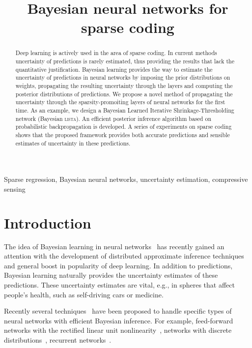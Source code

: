 \documentclass{article}
\title{Bayesian neural networks for sparse coding}
\begin{document}
\maketitle

\begin{abstract}
  Deep learning is actively used in the area of sparse coding. In current methods uncertainty of predictions is rarely estimated, thus providing the results that lack the quantitative justification. Bayesian learning provides the way to estimate the uncertainty of predictions in neural networks by imposing the prior distributions on weights, propagating the resulting uncertainty through the layers and computing the posterior distributions of predictions. We propose a novel method of propagating the uncertainty through the sparsity-promoiting layers of neural networks for the first time. As an example, we design a Bayesian Learned Iterative Shrinkage-Thresholding network (Bayesian \textsc{lista}). An efficient posterior inference algorithm based on probabilistic backpropagation is developed. A series of experiments on sparse coding shows that the proposed framework provides both accurate predictions and sensible estimates of uncertainty in these predictions.
\end{abstract}

\begin{keywords}
Sparse regression, Bayesian neural networks, uncertainty estimation, compressive sensing
\end{keywords}

\section{Introduction}
\label{sec:intro}

  The idea of Bayesian learning in neural networks~\cite{neal2012bayesian} has recently gained an attention with the development of distributed approximate inference techniques~\cite{li2015stochastic, hoffman2013stochastic} and general boost in popularity of deep learning. In addition to predictions, Bayesian learning naturally provides the uncertainty estimates of these predictions. These uncertainty estimates are vital, e.g., in spheres that affect people's health, such as self-driving cars or medicine.

  Recently several techniques~\cite{ranganath2015deep, gal2016dropout} have been proposed to handle specific types of neural networks with efficient Bayesian inference. For example, feed-forward networks with the rectified linear unit nonlinearity~\cite{hernandez2015probabilistic}, networks with discrete distributions~\cite{soudry2014expectation}, recurrent networks~\cite{mcdermott2017bayesian}.
\end{document}
